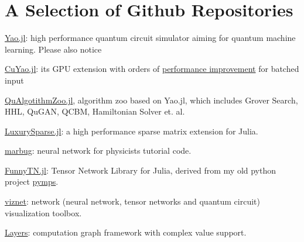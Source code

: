 \documentclass[letterpaper]{article}
\renewenvironment{itemize}{
  \begin{list}{}{
    \setlength{\leftmargin}{1.5em}
  }
}{
  \end{list}
}
\begin{document}
\section*{A Selection of Github Repositories}
\begin{itemize}
    \item \href{https://github.com/QuantumBFS/Yao.jl}{Yao.jl}: high performance quantum circuit simulator aiming for quantum machine learning. Please also notice
        \begin{itemize}
            \item \href{https://travis-ci.com/QuantumBFS/CuYao.jl}{CuYao.jl}: its GPU extension with orders of \href{https://github.com/QuantumBFS/CuYao.jl/issues/1}{performance improvement} for batched input
            \item \href{https://github.com/QuantumBFS/QuAlgorithmZoo.jl}{QuAlgotithmZoo.jl}, algorithm zoo based on Yao.jl, which includes Grover Search, HHL, QuGAN, QCBM, Hamiltonian Solver et. al.
        \end{itemize}
    \item \href{https://github.com/QuantumBFS/LuxurySparse.jl}{LuxurySparse.jl}: a high performance sparse matrix extension for Julia.
    \item \href{https://github.com/GiggleLiu/marburg}{marbug}: neural network for physicists tutorial code.
    \item \href{https://travis-ci.com/QuantumBFS/FunnyTN.jl}{FunnyTN.jl}: Tensor Network Library for Julia, derived from my old python project \href{https://github.com/GiggleLiu/pymps}{pymps}.
    \item \href{https://github.com/GiggleLiu/viznet}{viznet}: network (neural network, tensor networks and quantum circuit) visualization toolbox.
    \item \href{https://github.com/GiggleLiu/poorman\_nn}{Layers}: computation graph framework with complex value support.
\end{itemize}
\end{document}
